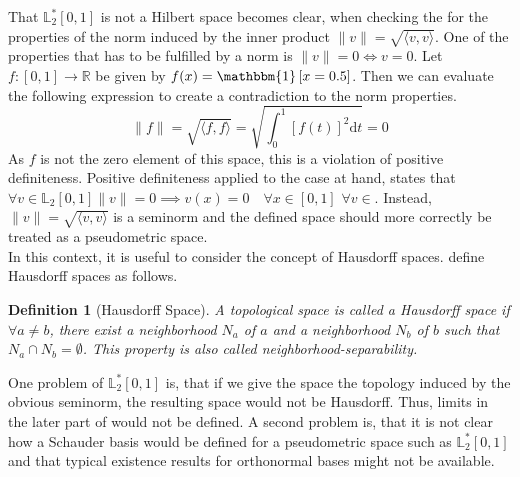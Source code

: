 \documentclass[12pt, a4paper]{article}
\theoremstyle{MAstyle} \newtheorem{assumption}{Assumption}[section]
\theoremstyle{MAstyle} \newtheorem{definition}{Definition}[section]
\theoremstyle{MAstyle} \newtheorem{theorem}{Theorem}[section]
\begin{document}
		That $\mathbb{L}^{*}_2[0,1]$ is not a Hilbert space becomes clear, when checking the for the properties of the norm induced by the inner product $\| v \| = \sqrt{\langle v, v\rangle}$.
		One of the properties that has to be fulfilled by a norm is $\| v \| = 0 \Longleftrightarrow v = 0$.			
		Let $f:[0,1] \rightarrow \mathbb{R}$ be given by $f(x) = \mathbbm{1}\left[x = 0.5\right]$. Then we can evaluate the following expression to create a contradiction to the norm properties.
		\begin{equation}
			\| f \| = \sqrt{\langle f, f\rangle} = \sqrt{\int_{0}^{1} \left[f(t)\right]^2\mathrm{d}t } = 0
		\end{equation}
		As $f$ is not the zero element of this space, this is a violation of positive definiteness. Positive definiteness applied to the case at hand, states that $\forall v \in \mathbb{L}_2[0,1] \| v \| = 0 \implies v(x) = 0 \quad \forall x \in [0,1]$  $\forall v \in $. Instead, $\| v \| = \sqrt{\langle v, v\rangle}$ is a seminorm and the defined space should more correctly be treated as a pseudometric space.\\
		
		In this context, it is useful to consider the concept of Hausdorff spaces. \cite{richmond_general_2020} define Hausdorff spaces as follows.
		\begin{definition}[Hausdorff Space]
			A topological space is called a Hausdorff space if $\forall a \neq b$, there exist a neighborhood $N_a$ of $a$ and a neighborhood $N_b$ of $b$ such that $N_a \cap N_b = \emptyset$. This property is also called neighborhood-separability.
		\end{definition}
		
		One problem of $\mathbb{L}^{*}_2[0,1]$ is, that if we give the space the topology induced by the obvious seminorm, the resulting space would not be Hausdorff. Thus, limits in the later part of \cite{bugni_permutation_2021} would not be defined.
		A second problem is, that it is not clear how a Schauder basis would be defined for a pseudometric space such as $\mathbb{L}^{*}_2[0,1]$ and that typical existence results for orthonormal bases might not be available.\\				
		
		\newpage
\end{document}
